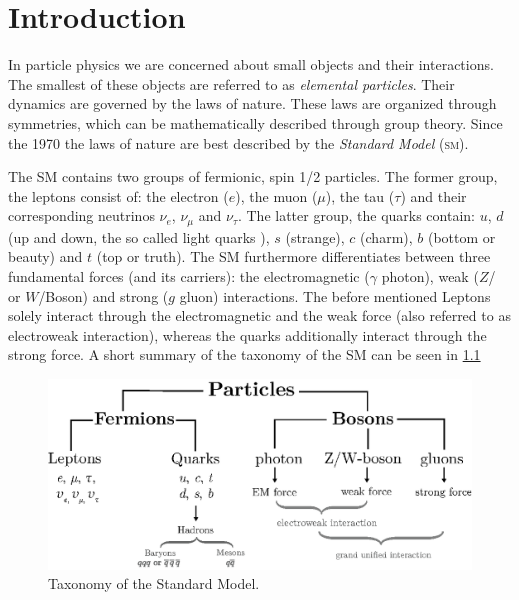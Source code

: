 \documentclass[../../index.tex]{subfiles}
\begin{document}
\chapter{Introduction}
In particle physics we are concerned about small objects and their interactions.
The smallest of these objects are referred to as \textit{elemental particles}.
Their dynamics are governed by the laws of nature. These laws are organized
through symmetries, which can be mathematically described through group theory.
Since the 1970 the laws of nature are best described by the \textit{Standard
  Model} (\textsc{sm}).


The SM contains two groups of fermionic, spin 1/2 particles. The former group,
the leptons consist of: the electron ($e$), the muon ($\mu$), the tau ($\tau$)
and their corresponding neutrinos $\nu_e$, $\nu_\mu$ and $\nu_\tau$. The latter
group, the quarks contain: $u$, $d$ (up and down, the so called light quarks ),
$s$ (strange), $c$ (charm), $b$ (bottom or beauty) and $t$ (top or truth). The SM
furthermore differentiates between three fundamental forces (and its carriers):
the electromagnetic ($\gamma$ photon), weak ($Z$\-/ or $W$\-/Boson) and strong ($g$
gluon) interactions. The before mentioned Leptons solely interact through the
electromagnetic and the weak force (also referred to as electroweak interaction),
whereas the quarks additionally interact through the strong force. A short
summary of the taxonomy of the SM can be seen in \cref{fig:SMTaxonomy}
\begin{figure}
  \centering
  \includegraphics[width=\textwidth]{./images/standardModelTaxonomy.eps}
  \caption{Taxonomy of the Standard Model.}
  \label{fig:SMTaxonomy}
\end{figure}
\end{document}
